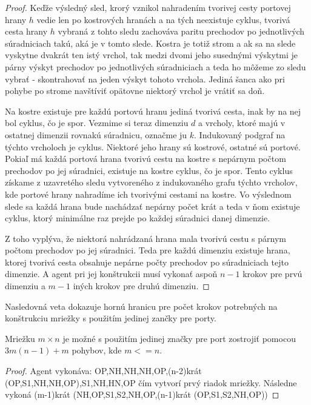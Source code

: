 \begin{proof}
Keďže výsledný sled, krorý vznikol nahradením tvorivej cesty portovej hrany
$h$ vedie len po kostrových hranách a na tých neexistuje cyklus, tvorivá
cesta hrany $h$ vybraná z tohto sledu zachováva paritu prechodov po
jednotlivých súradniciach takú, aká je v tomto slede.
Kostra je totiž strom a ak sa na slede vyskytne dvakrát ten istý vrchol, tak
medzi dvomi jeho susednými výskytmi je párny výskyt prechodov po
jednotlivých súradniciach a teda ho môžeme zo sledu vybrať - skontrahovať na
jeden výskyt tohoto vrchola. Jediná šanca ako pri pohybe po strome navštíviť
opätovne niektorý vrchol je vrátiť sa doň.

Na kostre existuje pre každú portovú hranu jediná tvorivá cesta, inak by na
nej bol cyklus, čo je spor.
Vezmime si teraz dimenziu $d$ a vrcholy, ktoré majú v ostatnej dimenzii
rovnakú súradnicu, označme ju $k$. Indukovaný podgraf na týchto vrcholoch je
cyklus. Niektoré jeho hrany sú kostrové, ostatné sú portové. Pokiaľ má každá
portová hrana tvorivú cestu na kostre s nepárnym počtom prechodov po jej
súradnici, existuje na kostre cyklus, čo je spor.
Tento cyklus získame z uzavretého sledu vytvoreného z indukovaného grafu
týchto vrcholov, kde portové hrany nahradíme ich tvorivými cestami na
kostre. Vo výslednom slede sa každá hrana bude nachádzať nepárny počet krát
a teda v ňom existuje cyklus, ktorý minimálne raz prejde po každej súradnici
danej dimenzie.

Z toho vyplýva, že niektorá nahrádzaná hrana mala tvorivú cestu s párnym
počtom prechodov po jej súradnici.
Teda pre každú dimenziu existuje hrana, ktorej tvorivá cesta obsahuje
nepárne počty prechodov po súradniciach tejto dimenzie. A agent pri jej
konštrukcii musí vykonať aspoň $n - 1$ krokov pre prvú dimenziu a $m - 1$
iných  krokov pre druhú dimenziu.
\end{proof}

Nasledovná veta dokazuje hornú hranicu pre počet krokov potrebných na
konštrukciu mriežky s použitím jedinej zančky pre porty.

\begin{veta}
Mriežku $m \times n$ je možné s použitím jedinej značky pre port zostrojiť
pomocou $3m(n - 1) + m$ pohybov, kde $m <= n$.
\end{veta}
\begin{proof}
Agent vykonáva: OP,NH,NH,NH,OP,(n-2)krát (OP,S1,NH,NH,OP),S1,NH,HN,OP čím
vytvorí prvý riadok mriežky. Následne vykoná
(m-1)krát (NH,OP,S1,S2,NH,OP,(n-1)krát (OP,S1,S2,NH,OP))
\end{proof}


